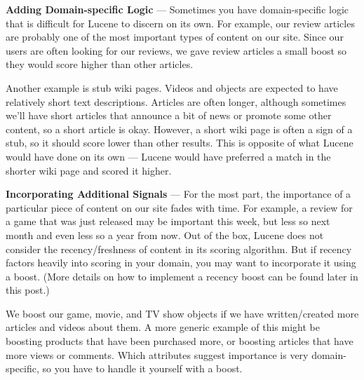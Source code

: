 \par \textbf{Adding Domain-specific Logic} — Sometimes you have domain-specific logic that is difficult for Lucene to discern on its own. For example, our review articles are probably one of the most important types of content on our site. Since our users are often looking for our reviews, we gave review articles a small boost so they would score higher than other articles.
\par Another example is stub wiki pages. Videos and objects are expected to have relatively short text descriptions. Articles are often longer, although sometimes we’ll have short articles that announce a bit of news or promote some other content, so a short article is okay. However, a short wiki page is often a sign of a stub, so it should score lower than other results. This is opposite of what Lucene would have done on its own — Lucene would have preferred a match in the shorter wiki page and scored it higher.
\par \textbf{Incorporating Additional Signals} — For the most part, the importance of a particular piece of content on our site fades with time. For example, a review for a game that was just released may be important this week, but less so next month and even less so a year from now. Out of the box, Lucene does not consider the recency/freshness of content in its scoring algorithm. But if recency factors heavily into scoring in your domain, you may want to incorporate it using a boost. (More details on how to implement a recency boost can be found later in this post.)
\par We boost our game, movie, and TV show objects if we have written/created more articles and videos about them. A more generic example of this might be boosting products that have been purchased more, or boosting articles that have more views or comments. Which attributes suggest importance is very domain-specific, so you have to handle it yourself with a boost.
